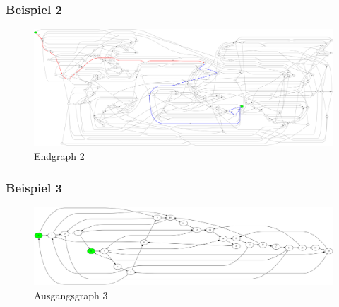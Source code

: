 \documentclass[a4paper,10pt,ngerman]{scrartcl}
\begin{document}
      \subsubsection{Beispiel 2\label{sec:Beispiele:2}}
        
        \begin{figure}[H]
          \centering
          \includegraphics[width=15cm]{../beispielausgaben/huepfburg2_end.png}
          \caption{Endgraph 2}
          \label{fig:Endgraph2}
        \end{figure}

      \subsubsection{Beispiel 3}
        \begin{figure}[H]
          \centering
          \includegraphics[width=15cm]{../beispielausgaben/huepfburg3_end.png}
          \caption{Ausgangsgraph 3}
          \label{fig:Ausgangsgraph3}
        \end{figure}
        
\end{document}
